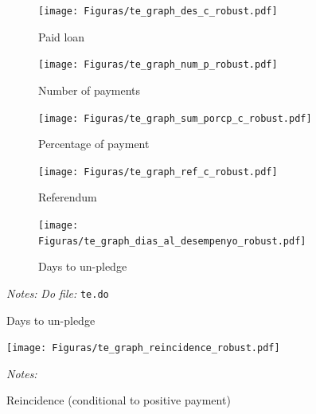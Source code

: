 \documentclass[11pt]{article}
\begin{document}
\begin{figure}[H]
    \caption{Treatment Effect (conditional to positive payment)}
    \label{te_robust_table}
    \begin{center}
    \begin{subfigure}{0.4\textwidth}
        \caption{Paid loan}
        \centering
        \texttt{[image: Figuras/te\_graph\_des\_c\_robust.pdf]}
    \end{subfigure}
    \begin{subfigure}{0.4\textwidth}
        \caption{Number of payments}
        \centering
        \texttt{[image: Figuras/te\_graph\_num\_p\_robust.pdf]}
    \end{subfigure}
     \begin{subfigure}{0.4\textwidth}
      \caption{Percentage of payment}
        \centering
        \texttt{[image: Figuras/te\_graph\_sum\_porcp\_c\_robust.pdf]}
    \end{subfigure}
     \begin{subfigure}{0.4\textwidth}
      \caption{Referendum}
        \centering
        \texttt{[image: Figuras/te\_graph\_ref\_c\_robust.pdf]}
    \end{subfigure}
      \begin{subfigure}{0.4\textwidth}
      \caption{Days to un-pledge}
        \centering
        \texttt{[image: Figuras/te\_graph\_dias\_al\_desempenyo\_robust.pdf]}
    \end{subfigure}
    \end{center}
     \footnotesize \textit{Notes: } 
      \footnotesize{ \textit{Do file: }  \texttt{te.do}}
\end{figure}

\begin{figure}[H]
        \caption{Reincidence (conditional to positive payment)}
    \label{reincidence_positive}
    \begin{center}
        \centering
        \texttt{[image: Figuras/te\_graph\_reincidence\_robust.pdf]}
    \end{center}
     \footnotesize \textit{Notes: } 
      \footnotesize{ }
\end{figure}
\end{document}
